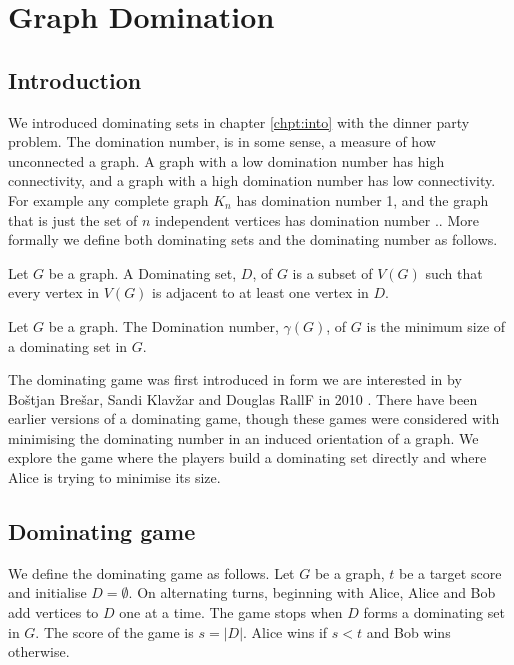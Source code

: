 \chapter{Graph Domination}\label{chpt:domSet}

\section{Introduction}

We introduced dominating sets in chapter \ref{chpt:into} with the dinner party problem. The domination number, is in some sense, a measure of how unconnected a graph. A graph with a low domination number has high connectivity, and a graph with a high domination number has low connectivity. For example any complete graph $K_n$ has domination number 1, and the graph that is just the set of $n$ independent vertices has domination number $.$. More formally we define  both dominating sets and the dominating number as follows.

\begin{definition}
    Let $G$ be a graph. A Dominating set, $D$, of $G$ is a subset of $V(G)$ such that every vertex in $V(G)$ is adjacent to at least one vertex in $D$.
\end{definition} 
\begin{definition}
    Let $G$ be a graph. The Domination number, $\gamma(G)$, of $G$ is the minimum size of a dominating set in $G$.
\end{definition}

 The dominating game was first introduced in form we are interested in by Bo\v{s}tjan Bre\v{s}ar, Sandi Klav\v{z}ar and Douglas RallF in 2010 \cite{BrKlRa2010}. There have been earlier versions of a dominating game, though these games were considered with minimising the dominating number in an induced orientation of a graph. We explore the game where the players build a dominating set directly and where Alice is trying to minimise its size. 


\section{Dominating game}

We define the dominating game as follows. Let $G$ be a graph, $t$ be a target score and initialise $D=\emptyset$. On alternating turns, beginning with Alice, Alice and Bob add vertices to $D$ one at a time. The game stops when $D$ forms a dominating set in $G$. The score of the game is $s=|D|$. Alice wins if $s<t$ and Bob wins otherwise. %

